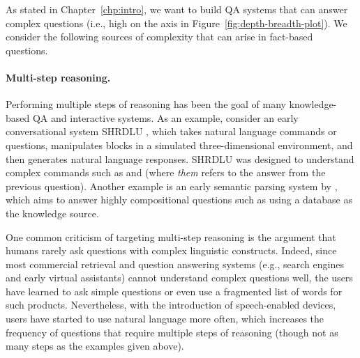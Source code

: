 As stated in Chapter~\ref{chp:intro},
we want to build QA systems
that can answer complex questions
(i.e.,
high on the \Depth axis in Figure~\ref{fig:depth-breadth-plot}).
We consider the following sources of complexity
that can arise in fact-based questions.

\paragraph{Multi-step reasoning.}
Performing multiple steps of reasoning
has been the goal of many knowledge-based QA
and interactive systems.
As an example, consider an early conversational system SHRDLU
\cite{winograd1972language},
which takes natural language commands or questions,
manipulates blocks in a simulated
three-dimensional environment,
and then generates natural language responses.
SHRDLU was designed to understand complex commands such as
and
(where \emph{them} refers to the answer from the previous question).
Another example is an early semantic parsing system
by \citet{zelle96geoquery},
which aims to answer highly compositional questions
such as
using a database as the knowledge source.

One common criticism of targeting multi-step reasoning
is the argument that humans rarely ask questions with complex linguistic constructs.
Indeed, since most commercial retrieval and question answering systems
(e.g., search engines and early virtual assistants)
cannot understand complex questions well,
the users have learned to ask simple questions
or even use a fragmented list of words
for such products.
Nevertheless, with the introduction of speech-enabled devices,
users have started to use natural language more often,
which increases the frequency of questions
that require multiple steps of reasoning
(though not as many steps as the examples given above).

